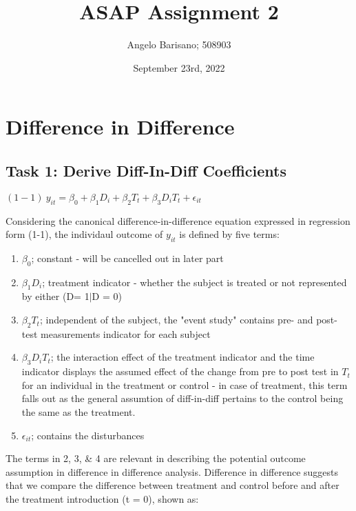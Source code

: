 \documentclass[a4paper]{article}
\begin{document}
\title{ASAP Assignment 2}
\author{Angelo Barisano; 508903 }
\date{September 23rd, 2022}
\maketitle

\newpage
\section{Difference in Difference}






\subsection{Task 1: Derive Diff-In-Diff Coefficients}

$(1-1) \ {y_{it}} = \beta_{0} + \beta_{1} D_i + \beta_{2} T_t+ \beta_{3} D_i T_t + \epsilon_{it}$



Considering the canonical difference-in-difference equation expressed in regression form (1-1), the individaul outcome of ${y_{it}}$ is defined by five terms:

\begin{enumerate}
	\item $\beta_{0}$; constant - will be cancelled out in later part
	\item $\beta_{1} D_i$; treatment indicator - whether the subject is treated or not represented by either (D= 1$ | $D = 0)
	\item $\beta_{2} T_t$; independent of the subject, the "event study" contains pre- and post-test measurements indicator for each subject
	\item $\beta_{3} D_i T_t$; the interaction effect of the treatment indicator and the time indicator displays the assumed effect of the change from pre to post test in $T_t$ for an individual in the treatment or control - in case of treatment, this term falls out as the general assumtion of diff-in-diff pertains to the control being the same as the treatment. 
	\item $\epsilon_{it}$; contains the disturbances
\end{enumerate}


The terms in 2, 3, \& 4 are relevant in describing the potential outcome assumption in difference in difference analysis. Difference in difference suggests that we compare the difference between treatment and control before and after the treatment introduction (t = 0), shown as:
\end{document}
